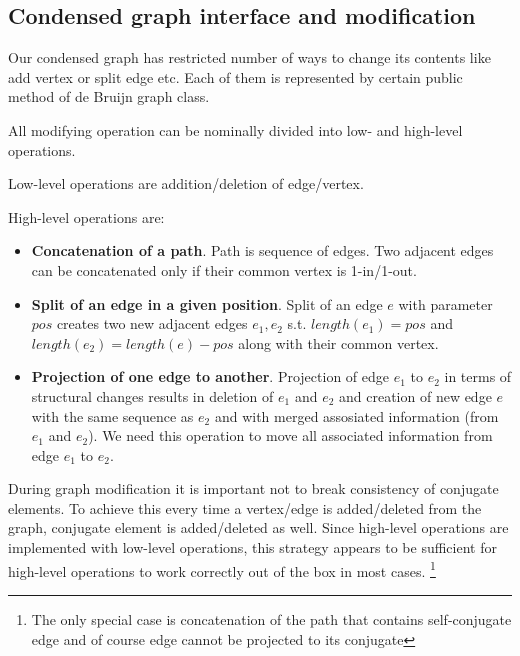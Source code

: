 \documentclass[12pt]{article}
\newcommand{\dbg}{de Bruijn graph}
\begin{document}

\subsection{Condensed graph interface and modification}

Our condensed graph has restricted number of ways to change its contents like add vertex or split edge etc. Each of them is represented by certain public method of \dbg{} class.

All modifying operation can be nominally divided into low- and high-level operations.

Low-level operations are addition/deletion of edge/vertex.

High-level operations are:
\begin{itemize}
\item \textbf{Concatenation of a path}. Path is sequence of edges. Two adjacent edges can be concatenated only if their common vertex is 1-in/1-out.

\item \textbf{Split of an edge in a given position}. Split of an edge $e$ with parameter $pos$ creates two new adjacent edges $e_1, e_2$ s.t. $length(e_1) = pos$ and $length(e_2) = length(e) - pos$ along with their common vertex. %

\item \textbf{Projection of one edge to another}. Projection of edge $e_1$ to $e_2$ in terms of structural changes results in deletion of $e_1$ and $e_2$ and creation of new edge $e$ with the same sequence as $e_2$ and with merged assosiated information (from $e_1$ and $e_2$). We need this operation to move all associated information from edge $e_1$ to $e_2$. 

\end{itemize}


During graph modification it is important not to break consistency of conjugate elements. 
To achieve this every time a vertex/edge is added/deleted from the graph, conjugate element is added/deleted as well.
Since high-level operations are implemented with low-level operations, this strategy appears to be sufficient for high-level operations to work correctly out of the box in most cases. \footnote{The only special case is concatenation of the path that contains self-conjugate edge and of course edge cannot be projected to its conjugate}
\end{document}
